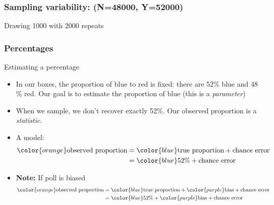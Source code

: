 \documentclass[handout]{beamer}
\begin{document}
   \begin{frame}
   \frametitle{Sampling variability: (N=48000, Y=52000)}
   \begin{center}
   \end{center}
   Drawing 1000 with 2000 repeats
   \end{frame}


   \begin{frame} \frametitle{Percentages}

   \begin{block}
   {Estimating a percentage}
   \begin{itemize}
   \item In our boxes, the proportion of blue to red is fixed: there
   are 52\% blue and 48 \% red. Our goal is to estimate
   the proportion of blue (this is a {\em \color{blue} parameter})
   \item When we sample, we don't recover exactly 52\%. Our observed
   proportion is a {\em \color{orange} statistic}.
   \item A model:
   $$
   \begin{aligned}
   {\color{orange} \text{observed proportion}} &= {\color{blue} \text{true proportion}} + \text{chance error} \\
   &= {\color{blue} 52\%} + \text{chance error} \\
   \end{aligned}
   $$
   \item {\bf Note:} If poll is biased
   $$
   \begin{aligned}
   {\color{orange} \text{observed proportion}} &= {\color{blue} \text{true proportion}} + {\color{purple} \text{bias}} + \text{chance error} \\
   &= {\color{blue} 52\%} + {\color{purple} \text{bias}} + \text{chance error} \\
   \end{aligned}
   $$
   \end{itemize}
   \end{block}
   \end{frame}

\end{document}
